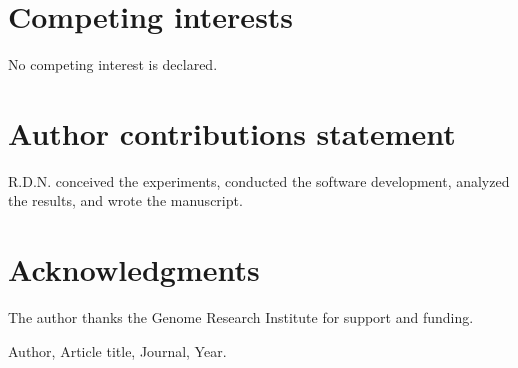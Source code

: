 \documentclass[unnumsec,webpdf,contemporary,large]{oup-authoring-template}%
\theoremstyle{thmstyleone}%
\begin{document}
\section{Competing interests}
No competing interest is declared.

\section{Author contributions statement}
R.D.N. conceived the experiments, conducted the software development, analyzed the results, and wrote the manuscript.

\section{Acknowledgments}
The author thanks the Genome Research Institute for support and funding.

\begin{thebibliography}{1}

Author, Article title, Journal, Year.

\end{thebibliography}
\end{document}

